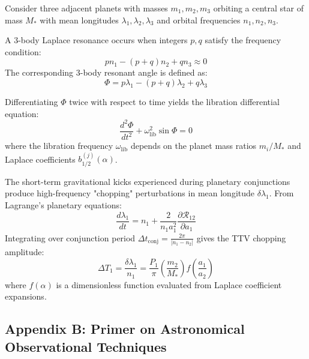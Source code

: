 \documentclass[11pt,a4paper]{article}
\begin{document}
Consider three adjacent planets with masses $m_1, m_2, m_3$ orbiting a central star of mass $M_*$ with mean longitudes $\lambda_1, \lambda_2, \lambda_3$ and orbital frequencies $n_1, n_2, n_3$.

A 3-body Laplace resonance occurs when integers $p, q$ satisfy the frequency condition:
\begin{equation}
p n_1 - (p+q) n_2 + q n_3 \approx 0
\end{equation}
The corresponding 3-body resonant angle is defined as:
\begin{equation}
\Phi = p \lambda_1 - (p+q) \lambda_2 + q \lambda_3
\end{equation}

Differentiating $\Phi$ twice with respect to time yields the libration differential equation:
\begin{equation}
\frac{d^2 \Phi}{d t^2} + \omega_{\text{lib}}^2 \sin \Phi = 0
\end{equation}
where the libration frequency $\omega_{\text{lib}}$ depends on the planet mass ratios $m_i / M_*$ and Laplace coefficients $b_{1/2}^{(j)}(\alpha)$.

The short-term gravitational kicks experienced during planetary conjunctions produce high-frequency "chopping" perturbations in mean longitude $\delta \lambda_1$. From Lagrange's planetary equations:
\begin{equation}
\frac{d \lambda_1}{dt} = n_1 + \frac{2}{n_1 a_1^2} \frac{\partial \mathcal{R}_{12}}{\partial a_1}
\end{equation}
Integrating over conjunction period $\Delta t_{\text{conj}} = \frac{2\pi}{|n_1 - n_2|}$ gives the TTV chopping amplitude:
\begin{equation}
\Delta T_1 = \frac{\delta \lambda_1}{n_1} = \frac{P_1}{\pi} \left(\frac{m_2}{M_*}\right) f\left(\frac{a_1}{a_2}\right)
\end{equation}
where $f(\alpha)$ is a dimensionless function evaluated from Laplace coefficient expansions.

\subsection*{Appendix B: Primer on Astronomical Observational Techniques}
\end{document}
